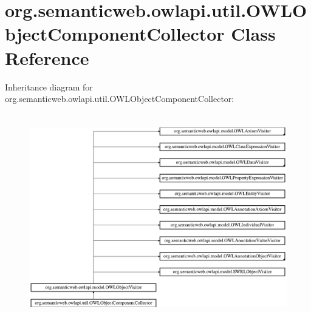 \hypertarget{classorg_1_1semanticweb_1_1owlapi_1_1util_1_1_o_w_l_object_component_collector}{\section{org.\-semanticweb.\-owlapi.\-util.\-O\-W\-L\-Object\-Component\-Collector Class Reference}
\label{classorg_1_1semanticweb_1_1owlapi_1_1util_1_1_o_w_l_object_component_collector}
}
Inheritance diagram for org.\-semanticweb.\-owlapi.\-util.\-O\-W\-L\-Object\-Component\-Collector\-:\begin{figure}[H]
\begin{center}
\leavevmode
\includegraphics[height=9.056604cm]{classorg_1_1semanticweb_1_1owlapi_1_1util_1_1_o_w_l_object_component_collector}
\end{center}
\end{figure}
